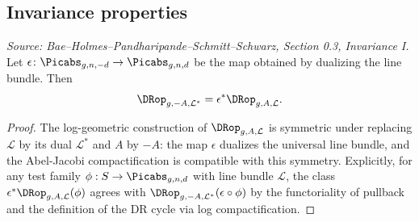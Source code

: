 \subsection{Invariance properties}

\begin{lemma}
  \label{lem:invariance_dualizing}
  \textit{Source: Bae--Holmes--Pandharipande--Schmitt--Schwarz, Section 0.3, Invariance I.}
  Let $\epsilon\colon \Picabs_{g,n,-d} \to \Picabs_{g,n,d}$ be the map obtained by dualizing
  the line bundle.  Then
  \[
    \DRop_{g,-A,\mathcal{L}^*} = \epsilon^* \DRop_{g,A,\mathcal{L}}.
  \]
\end{lemma}

\begin{proof}
  The log-geometric construction of $\DRop_{g,A,\mathcal{L}}$ is symmetric under replacing
  $\mathcal{L}$ by its dual $\mathcal{L}^*$ and $A$ by $-A$: the map
  $\epsilon$ dualizes the universal line bundle, and the Abel-Jacobi compactification is
  compatible with this symmetry. Explicitly, for any test family $\phi: S \to \Picabs_{g,n,d}$
  with line bundle $\mathcal{L}$, the class $\epsilon^*\DRop_{g,A,\mathcal{L}}(\phi)$ agrees
  with $\DRop_{g,-A,\mathcal{L}^*}(\epsilon \circ \phi)$ by the functoriality of pullback
  and the definition of the DR cycle via log compactification.
\end{proof}


